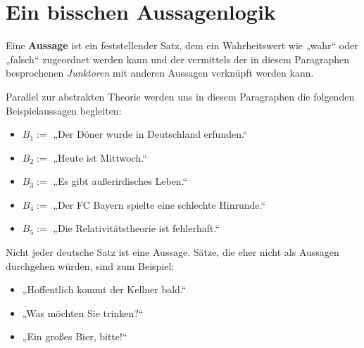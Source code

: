 \section{Ein bisschen Aussagenlogik}

\begin{de}[Aussage]
Eine \textbf{Aussage} ist ein feststellender Satz, dem ein Wahrheitswert wie „wahr“ oder „falsch“ zugeordnet werden kann und
der vermittels der in diesem Paragraphen besprochenen \emph{Junktoren} mit anderen Aussagen verknüpft werden kann. %
	\end{de}

	


	\begin{bsp}
Parallel zur abstrakten Theorie werden uns in diesem Paragraphen die folgenden Beispielaussagen begleiten:
		\begin{itemize}
			\item $B_1 :=$ „Der Döner wurde in Deutschland erfunden.“
			\item $B_2 :=$ „Heute ist Mittwoch.“
			\item $B_3 :=$ „Es gibt außerirdisches Leben.“
			\item $B_4 :=$ „Der FC Bayern spielte eine schlechte Hinrunde.“
			\item $B_5 :=$ „Die Relativitätstheorie ist fehlerhaft.“
		\end{itemize}
Nicht jeder deutsche Satz ist eine Aussage. Sätze, die eher nicht als Aussagen durchgehen würden, sind zum Beispiel: \quad
 \begin{itemize}
\item „Hoffentlich kommt der Kellner bald.“
\item „Was möchten Sie trinken?“
\item „Ein großes Bier, bitte!“
\end{itemize}
	\end{bsp}
	


